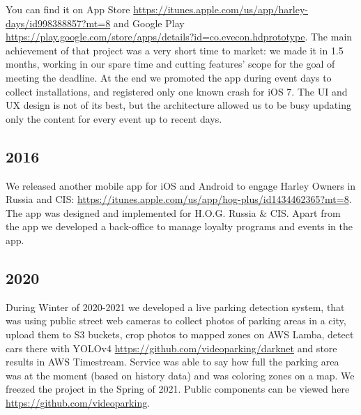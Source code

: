 You can find it on App Store
\href{https://itunes.apple.com/us/app/harley-days/id998388857?mt=8}{\url{https://itunes.apple.com/us/app/harley-days/id998388857?mt=8}}
and Google Play
\href{https://play.google.com/store/apps/details?id=co.evecon.hdprototype}{\url{https://play.google.com/store/apps/details?id=co.evecon.hdprototype}}.
The main achievement of that project was a very short time to market:
we made it in 1.5 months, working in our spare time and cutting
features' scope for the goal of meeting the deadline. At the end we
promoted the app during event days to collect installations, and
registered only one known crash for iOS 7. The UI and UX design is not
of its best, but the architecture allowed us to be busy updating only the
content for every event up to recent days.

\subsection*{2016}

We released another mobile app for iOS and Android to engage Harley
Owners in Russia and CIS:
\href{https://itunes.apple.com/us/app/hog-plus/id1434462365?mt=8}{\url{https://itunes.apple.com/us/app/hog-plus/id1434462365?mt=8}}.
The app was designed and implemented for H.O.G. Russia \& CIS. Apart
from the app we developed a back-office to manage loyalty programs and
events in the app.

\subsection*{2020}

During Winter of 2020-2021 we developed a live parking detection system,
that was using public street web cameras to collect photos of parking
areas in a city, upload them to S3 buckets, crop photos to mapped zones
on AWS Lamba, detect cars there with YOLOv4
\href{https://github.com/videoparking/darknet}{\url{https://github.com/videoparking/darknet}}
and store results in AWS Timestream. Service was able to say how full
the parking area was at the moment (based on history data) and was coloring
zones on a map. We freezed the project in the Spring of 2021. Public components
can be viewed here
\href{https://github.com/videoparking}{\url{https://github.com/videoparking}}.
